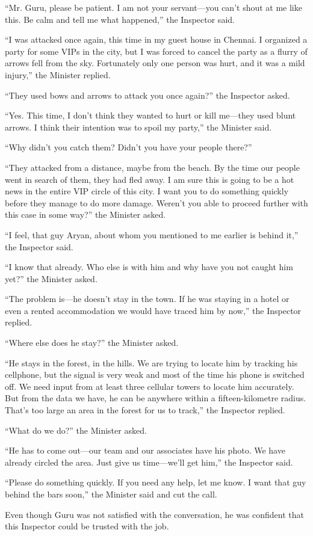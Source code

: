 “Mr. Guru, please be patient. I am not your servant—you can't shout at me like
this. Be calm and tell me what happened,” the Inspector said.

“I was attacked once again, this time in my guest house in Chennai. I organized
a party for some VIPs in the city, but I was forced to cancel the party as a
flurry of arrows fell from the sky. Fortunately only one person was hurt, and it
was a mild injury,” the Minister replied.

“They used bows and arrows to attack you once again?” the Inspector asked.

“Yes. This time, I don't think they wanted to hurt or kill me—they used blunt
arrows. I think their intention was to spoil my party,” the Minister said.

“Why didn't you catch them? Didn't you have your people there?”

“They attacked from a distance, maybe from the beach. By the time our people
went in search of them, they had fled away. I am sure this is going to be a hot
news in the entire VIP circle of this city. I want you to do something quickly
before they manage to do more damage. Weren't you able to proceed further with
this case in some way?” the Minister asked.

“I feel, that guy Aryan, about whom you mentioned to me earlier is behind it,”
the Inspector said.

“I know that already. Who else is with him and why have you not caught him yet?”
the Minister asked.

“The problem is—he doesn't stay in the town. If he was staying in a hotel or
even a rented accommodation we would have traced him by now,” the Inspector
replied.

“Where else does he stay?” the Minister asked.

“He stays in the forest, in the hills. We are trying to locate him by tracking
his cellphone, but the signal is very weak and most of the time his phone is
switched off. We need input from at least three cellular towers to locate him
accurately. But from the data we have, he can be anywhere within a
fifteen-kilometre radius. That's too large an area in the forest for us to
track,” the Inspector replied.

“What do we do?” the Minister asked.

“He has to come out—our team and our associates have his photo. We have
already circled the area. Just give us time—we'll get him,” the Inspector
said.

“Please do something quickly. If you need any help, let me know. I want that guy
behind the bars soon,” the Minister said and cut the call.

Even though Guru was not satisfied with the conversation, he was confident that
this Inspector could be trusted with the job.